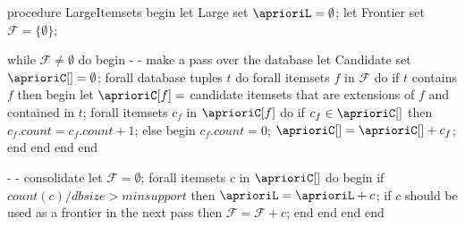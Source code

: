 procedure LargeItemsets
begin
	let Large set $\aprioriL=\emptyset$;
	let Frontier set $\mathcal{F}=\{\emptyset\}$;
  
	while $\mathcal{F}\neq\emptyset$ do begin
		- - make a pass over the database
		let Candidate set $\aprioriC[]=\emptyset$;
		forall database tuples $t$ do
			forall itemsets $f$ in $\mathcal{F}$ do
				if $t$ contains $f$ then begin
					let $\aprioriC[f]=$ candidate itemsets that are extensions of $f$ 
              and contained in $t$;
					forall itemsets $c_f$ in $\aprioriC[f]$ do
						if  $c_f\in \aprioriC[]$ then
							$c_f.count = c_f.count + 1$;
						else begin
							$c_f.count = 0$;
							$\aprioriC[] = \aprioriC[] + c_f$;
						end
					end
				end
			end
      
			- - consolidate
			let $\mathcal{F} = \emptyset$;
			forall itemsets $c$ in $\aprioriC[]$ do begin
				if $count(c)/dbsize > minsupport$ then
					$\aprioriL = \aprioriL + c$;
				if $c$ should be used as a frontier in the next pass then
					$\mathcal{F} = \mathcal{F} + c$;
			end
		end
	end
end
